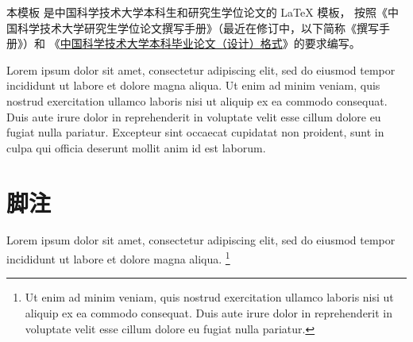 
本模板  是中国科学技术大学本科生和研究生学位论文的 \LaTeX{}
模板， 按照《中国科学技术大学研究生学位论文撰写手册》（最近在修订中，以下简称《撰写手册》）和
《\href{https://www.teach.ustc.edu.cn/?attachment_id=13867}
{中国科学技术大学本科毕业论文（设计）格式}》的要求编写。

Lorem ipsum dolor sit amet, consectetur adipiscing elit, sed do eiusmod tempor
incididunt ut labore et dolore magna aliqua.
Ut enim ad minim veniam, quis nostrud exercitation ullamco laboris nisi ut
aliquip ex ea commodo consequat.
Duis aute irure dolor in reprehenderit in voluptate velit esse cillum dolore eu
fugiat nulla pariatur.
Excepteur sint occaecat cupidatat non proident, sunt in culpa qui officia
deserunt mollit anim id est laborum.



\section{脚注}

Lorem ipsum dolor sit amet, consectetur adipiscing elit, sed do eiusmod tempor
incididunt ut labore et dolore magna aliqua.
\footnote{Ut enim ad minim veniam, quis nostrud exercitation ullamco laboris
  nisi ut aliquip ex ea commodo consequat.
  Duis aute irure dolor in reprehenderit in voluptate velit esse cillum dolore
  eu fugiat nulla pariatur.}
